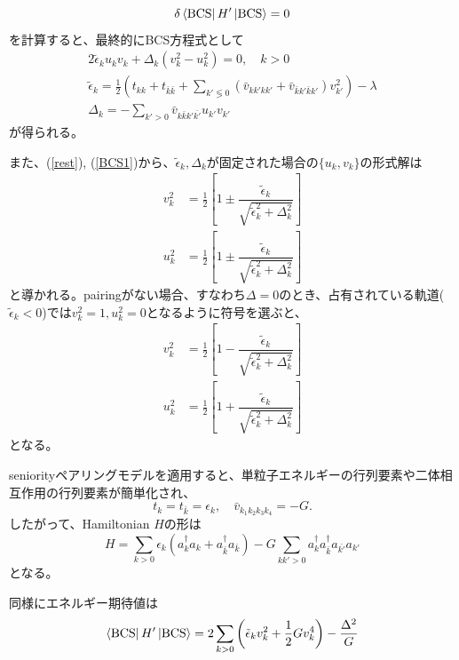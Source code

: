 \documentclass[a4paper,11pt]{jsreport}
\newcommand{\BCSexp}[1]{\bra{\text{BCS}} {#1} \ket{\text{BCS}}}
\begin{document}
  \begin{equation}
      \delta\BCSexp{H'}=0
  \end{equation}
  を計算すると、最終的にBCS方程式として
  \begin{align}
      2\tilde{\epsilon}_ku_kv_k+\Delta_k(v_k^2-u_k^2)=0, \quad k>0\label{BCS1} \\
      \tilde{\epsilon}_k=\frac{1}{2}\left(t_{kk}+t_{\bar{k}\bar{k}}+\sum_{k'\lessgtr0}(\bar{v}_{kk'kk'}+\bar{v}_{\bar{k}k'\bar{k}k'})v_{k'}^2\right)-\lambda\\
      \Delta_k=-\sum_{k'>0}\bar{v}_{k\bar{k}k'\bar{k'}}u_{k'}v_{k'}\label{Delta1}
  \end{align}
  が得られる。\par
  また、(\ref{rest}), (\ref{BCS1})から、\(\tilde{\epsilon}_k, \Delta_k\)が固定された場合の\(\{u_k,v_k\}\)の形式解は
  \begin{align}
      v_k^2&=\frac{1}{2}\left[
        1\pm\dfrac{\tilde{\epsilon}_k}{\sqrt{\tilde{\epsilon}_k^2+\Delta_k^2}}
      \right]\\
      u_k^2&=\frac{1}{2}\left[
        1\pm\dfrac{\tilde{\epsilon}_k}{\sqrt{\tilde{\epsilon}_k^2+\Delta_k^2}}
      \right]
  \end{align}
  と導かれる。pairingがない場合、すなわち\(\Delta=0\)のとき、占有されている軌道(\(\tilde{\epsilon}_k<0\))では\(v_k^2=1, u_k^2=0\)となるように符号を選ぶと、
  \begin{align}
      v_k^2&=\frac{1}{2}\left[
        1-\dfrac{\tilde{\epsilon}_k}{\sqrt{\tilde{\epsilon}_k^2+\Delta_k^2}}
      \right]\\
      u_k^2&=\frac{1}{2}\left[
        1+\dfrac{\tilde{\epsilon}_k}{\sqrt{\tilde{\epsilon}_k^2+\Delta_k^2}}
      \right]
  \end{align}
  となる。\par
  seniorityペアリングモデルを適用すると、単粒子エネルギーの行列要素や二体相互作用の行列要素が簡単化され、
  \begin{equation}
      t_{k}=t_{\bar{k}}=\epsilon_k, \quad \bar{v}_{k_1k_2k_3k_4}=-G.
  \end{equation}
  したがって、Hamiltonian \(H\)の形は
  \begin{equation}
      H=\sum_{k>0}\epsilon_k(a^{\dagger}_ka_k+a^{\dagger}_{\bar{k}}a_{\bar{k}})-G\sum_{kk'>0}a^{\dagger}_ka^{\dagger}_{\bar{k}}a_{\bar{k'}}a_{k'}\label{Hamiltonian1}
  \end{equation}
  となる。\par
  同様にエネルギー期待値は
  \begin{equation}
      \BCSexp{H'}=2\sum_{k>0}\left(\tilde{\epsilon}_kv_k^2+\frac{1}{2}Gv_k^4\right)-\frac{\Delta^2}{G}
  \end{equation}
\end{document}
